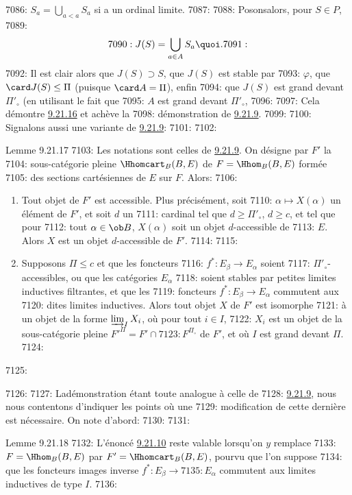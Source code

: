 7086: $S_a=\bigcup_{a<a}S_a$ si a un ordinal limite.
7087: 
7088: Posons\pageoriginale alors, pour $S\in P$,
7089: $$
7090: J(S)=\bigcup_{a\in A}S_a{\quoi}.
7091: $$
7092: Il est clair alors que $J(S)\supset S$, que $J(S)$ est stable par
7093: $\varphi$, que $\card J(S)\leq \Pi$ (puisque $\card A=\Pi$), enfin
7094: que $J(S)$ est grand devant $\Pi'_{\circ}$ (en utilisant le fait que
7095: $A$ est grand devant $\Pi'_{\circ}$,
7096: 
7097: Cela démontre \hyperref[I.lem9.21.16]{9.21.16} et achève la
7098: démonstration de \hyperref[I.lem9.21.9]{9.21.9}.
7099: 
7100: Signalons aussi une variante de \hyperref[I.lem9.21.9]{9.21.9}:
7101: 
7102: \begin{enonce*}{Lemme 9.21.17}
7103: Les notations sont celles de \hyperref[I.lem9.21.9]{9.21.9}. On désigne par $F'$ la
7104: sous-catégorie pleine $\Hhomcart_B(B,E)$ de $F=\Hhom_B(B,E)$ formée
7105: des sections cartésiennes de $E$ sur $F$. Alors:
7106: \begin{enumerate}
7107: \renewcommand{\theenumi}{\roman{enumi}}
7108: \renewcommand{\labelenumi}{(\theenumi)}
7109: \item Tout objet de $F'$ est accessible. Plus précisément, soit
7110: $\alpha\mapsto X(\alpha)$ un élément de $F'$, et soit $d$ un
7111: cardinal tel que $d\geq \Pi'_{\circ}$, $d\geq c$, et tel que pour
7112: tout $\alpha\in \ob B$, $X(\alpha)$ soit un objet $d$-accessible de
7113: $E$. Alors $X$ est un objet $d$-accessible de $F'$.
7114: 
7115: \item Supposons $\Pi\leq c$ et que les foncteurs
7116: $f^\ast:E_{\beta}\rightarrow E_{\alpha}$ soient
7117: $\Pi'_{\circ}$-accessibles, ou que les catégories $E_{\alpha}$
7118: soient stables par petites limites inductives filtrantes, et que les
7119: foncteurs $f^\ast:E_{\beta}\rightarrow E_{\alpha}$ commutent aux
7120: dites limites inductives. Alors tout objet $X$ de $F'$ est isomorphe
7121: à un objet de la forme $\varinjlim_I X_i$, où pour tout $i\in I$,
7122: $X_i$ est un objet de la sous-catégorie pleine ${F'}^{\Pi}=F'\cap
7123: F^{\Pi_{\circ}}$ de $F'$, et où $I$ est grand devant $\Pi$.
7124: \end{enumerate}
7125: \end{enonce*}
7126: 
7127: La\pageoriginale démonstration étant toute analogue à celle de
7128: \hyperref[I.lem9.21.9]{9.21.9}, nous nous contentons d'indiquer les points où une
7129: modification de cette dernière est nécessaire. On note d'abord:
7130: 
7131: \begin{enonce*}{Lemme 9.21.18}
7132: L'énoncé \hyperref[I.lem9.21.10]{9.21.10} reste valable lorsqu'on $y$ remplace
7133: $F=\Hhom_B(B,E)$ par $F'=\Hhomcart_B(B,E)$, pourvu que l'on suppose
7134: que les foncteurs images inverse $f^\ast:E_{\beta}\rightarrow
7135: E_{\alpha}$ commutent aux limites inductives de type $I$.
7136: \end{enonce*}

